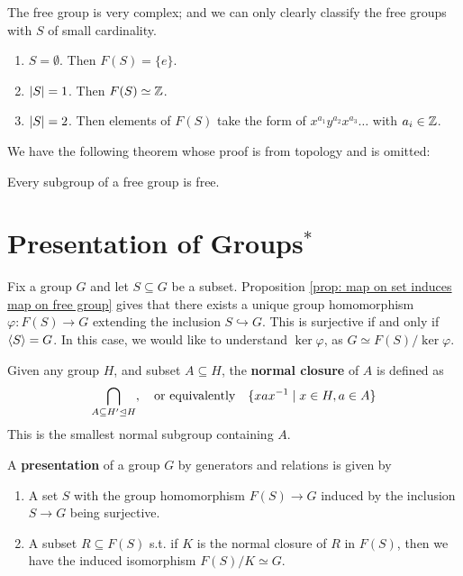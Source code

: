 \begin{example}
    The free group is very complex; and we can only clearly classify the free groups with $S$ of small cardinality.
    \begin{enumerate}[label=\arabic*)]
        \item $S = \emptyset$. Then $F(S) = \{e\}$.
        \item $\left|S\right| = 1$. Then $F(S) \simeq \mathbb{Z}$.
        \item $\left|S\right| = 2$. Then elements of $F(S)$ take the form of $x^{a_1}y^{a_2}x^{a_3} \dots$ with $a_i \in \mathbb{Z}$.
    \end{enumerate}
\end{example}

\textstart
We have the following theorem whose proof is from topology and is omitted:

\begin{theorem}[Schreier]
    Every subgroup of a free group is free.
\end{theorem}

\section{Presentation of Groups$^{\ast}$}

\textstart
Fix a group $G$ and let $S \subseteq G$ be a subset. Proposition \ref{prop: map on set induces map on free group} gives that there exists a unique group homomorphism $\varphi: F(S) \to G$ extending the inclusion $S \hookrightarrow G$. This is surjective if and only if $\left\langle S \right\rangle = G$. In this case, we would like to understand $\ker \varphi$, as $G \simeq F(S)/\ker \varphi$.

\begin{definition}
    Given any group $H$, and subset $A \subseteq H$, the \textbf{normal closure} of $A$ is defined as
    \[
        \bigcap_{A \subseteq H' \unlhd H}, \quad \text{or equivalently} \quad \{ xax^{-1} \mid x \in H, a \in A \}
    \]
    This is the smallest normal subgroup containing $A$.
\end{definition}

\begin{definition}
    A \textbf{presentation} of a group $G$ by generators and relations is given by
    \begin{enumerate}[label=\arabic*)]
        \item A set $S$ with the group homomorphism $F(S) \to G$ induced by the inclusion $S \to G$ being surjective.
        \item A subset $R \subseteq F(S)$ s.t. if $K$ is the normal closure of $R$ in $F(S)$, then we have the induced isomorphism $F(S)/K \simeq G$.
    \end{enumerate}
\end{definition}

